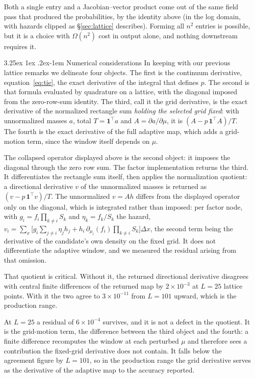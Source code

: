 \documentclass[11pt]{article}
\makeatletter
\renewcommand\paragraph{\@startsection{paragraph}{4}{\z@}%
  {3.25ex \@plus1ex \@minus.2ex}{-1em}%
  {\normalfont\normalsize\itshape}}
\makeatother
\begin{document}
Both a single entry and a
Jacobian--vector product come out of the same field pass that produced
the probabilities, by the identity above (in the log domain, with
hazards clipped as \S\ref{sec:lattice} describes). Forming all $n^{2}$
entries is possible, but it is a choice with $\Omega(n^{2})$ cost in
output alone, and nothing downstream requires it.

\paragraph{Numerical considerations} In keeping with our
previous lattice remarks we delineate four objects. The first is the continuum
derivative, equation~\eqref{eq:tie}, the exact derivative of the integral
that defines $p$. The second is that formula evaluated by quadrature on a
lattice, with the diagonal imposed from the zero-row-sum identity. The
third, call it the grid derivative, is the exact derivative of the
normalized rectangle sum \emph{holding the selected grid fixed}: with
unnormalized masses $a$, total $T=\mathbf{1}^{\top}a$ and $A=\partial
a/\partial\mu$, it is $(A-p\,\mathbf{1}^{\top}A)/T$. The fourth is the
exact derivative of the full adaptive map, which adds a grid-motion term,
since the window itself depends on $\mu$.

The collapsed operator displayed above is the second object: it imposes
the diagonal through the zero row sum. The factor implementation returns the third. It differentiates the rectangle sum
itself, then applies the normalization quotient: a directional derivative
$v$ of the unnormalized masses is returned as
$(v-p\,\mathbf{1}^{\top}v)/T$. The unnormalized $v=Ah$ differs from the
displayed operator only on the diagonal, which is integrated rather than
imposed: per factor node, with $g_i=f_i\prod_{k\ne i}S_k$ and
$\eta_k=f_k/S_k$ the hazard,
$v_i=\sum_x\bigl[g_i\sum_{j\ne i}\eta_jh_j+h_i\,\partial_{\mu_i}(f_i)\prod_{k\ne i}S_k\bigr]\Delta x$,
the second term being the derivative of the candidate's own density on the
fixed grid. It does not differentiate the adaptive
window, and we measured the residual arising from that omission.

That quotient is critical. Without it, the returned directional
derivative disagrees with central finite differences of the returned map
by $2\times10^{-3}$ at $L=25$ lattice points. With it the two agree to
$3\times10^{-11}$ from $L=101$ upward, which is the production range.

At $L=25$ a residual of $6\times10^{-4}$ survives, and it is not a defect
in the quotient. It is the grid-motion term, the difference between the
third object and the fourth: a finite difference recomputes the window at
each perturbed $\mu$ and therefore sees a contribution the fixed-grid
derivative does not contain. It falls below the agreement figure by
$L=101$, so in the production range the grid derivative serves as the
derivative of the adaptive map to the accuracy reported.
\end{document}
